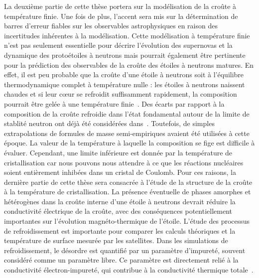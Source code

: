 La deuxième partie de cette thèse portera sur la modélisation de la croûte à 
température finie. Une fois de plus, l'accent sera mis sur la détermination 
de barres d'erreur fiables sur les observables astrophysiques en raison des 
incertitudes inhérentes à la modélisation. 
Cette modélisation à température finie n'est pas seulement essentielle pour 
décrire l'évolution des supernovas et la dynamique des protoétoiles à neutrons 
mais pourrait également être pertinente pour la prédiction des observables 
de la croûte des étoiles à neutrons matures. 
En effet, il est peu probable que la croûte d'une étoile à neutrons soit à 
l'équilibre thermodynamique complet à température nulle : les étoiles à
neutrons naissent chaudes et si leur c\oe ur se refroidit suffisamment 
rapidement, la composition pourrait être gelée à une température 
finie~\cite{Goriely2011}. 
Des écarts par rapport à la composition de la croûte refroidie dans l'état 
fondamental autour de la limite de stablité neutron ont déjà été considérées
dans~\cite{Bisnovaty1979}. Toutefois, de simples extrapolations de formules de
masse semi-empiriques avaient été utilisées à cette époque. 
La valeur de la température à laquelle la composition se fige est difficile 
à évaluer. Cependant, une limite inférieure est donnée par la température de 
cristallisation car nous pouvons nous attendre à ce que les réactions 
nucléaires soient entièrement inhibées dans un cristal de Coulomb. 
Pour ces raisons, la dernière partie de cette thèse sera consacrée à l'étude 
de la structure de la croûte à la température de cristallisation. 
La présence éventuelle de phases amorphes et hétérogènes dans la croûte 
interne d'une étoile à neutrons devrait réduire la conductivité électrique de 
la croûte, avec des conséquences potentiellement importantes sur l'évolution 
magnéto-thermique de l'étoile. L'étude des processus de refroidissement est
importante pour comparer les calculs théoriques et la température de 
surface mesurée par les satellites. Dans les simulations de refroidissement, le 
désordre est quantifié par un paramètre d'impureté, souvent considéré comme un 
paramètre libre. Ce paramètre est directement relié à la conductivité
électron-impureté, qui contribue à la conductivité thermique
totale~\cite{Flowers1976}. 
\\

